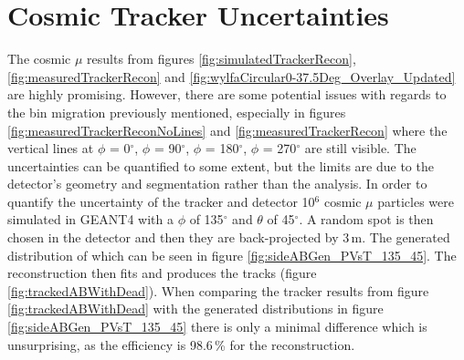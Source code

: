 \section{Cosmic Tracker Uncertainties}\label{sec:cosmicTrackerUncertainties}
The cosmic $\mu$ results from figures \ref{fig:simulatedTrackerRecon}, \ref{fig:measuredTrackerRecon} and \ref{fig:wylfaCircular0-37.5Deg_Overlay_Updated} are highly promising. However, there are some potential issues with regards to the bin migration previously mentioned, especially in figures \ref{fig:measuredTrackerReconNoLines} and \ref{fig:measuredTrackerRecon} where the vertical lines at $\phi$ = 0$^\circ$, $\phi$ = 90$^\circ$, $\phi$ = 180$^\circ$, $\phi$ = 270$^\circ$ are still visible. The uncertainties can be quantified to some extent, but the limits are due to the detector's geometry and segmentation rather than the analysis. In order to quantify the uncertainty of the tracker and detector 10$^6$ cosmic $\mu$ particles were simulated in GEANT4 with a $\phi$ of  135$^\circ$ and $\theta$ of 45$^\circ$. A random spot is then chosen in the detector and then they are back-projected by 3\,m. The generated distribution of which can be seen in figure \ref{fig:sideABGen_PVsT_135_45}. The reconstruction then fits and produces the tracks (figure \ref{fig:trackedABWithDead}). When comparing the tracker results from figure \ref{fig:trackedABWithDead} with the generated distributions in figure \ref{fig:sideABGen_PVsT_135_45} there is only a minimal difference which is unsurprising, as the efficiency is 98.6\,\% for the reconstruction. 

